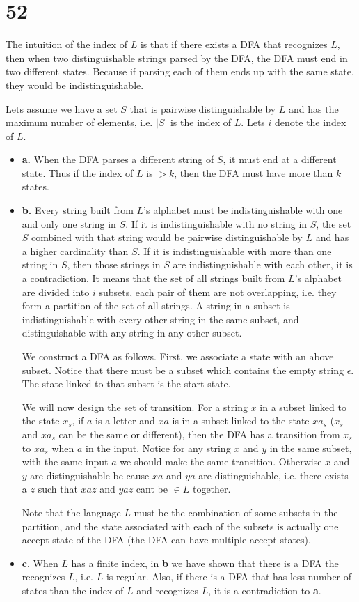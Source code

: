 \documentclass[12pt]{book}
\begin{document}
\section{52}
The intuition of the index of $L$ is that if there exists a DFA that recognizes $L$, then when two distinguishable strings parsed by the DFA, the DFA must end in two different states. Because if parsing each of them ends up with the same state, they would be indistinguishable.

Lets assume we have a set $S$ that is pairwise distinguishable by $L$ and has the maximum number of elements, i.e. $|S|$ is the index of $L$. Lets  $i$ denote the index of $L$.
\begin{itemize}
	\item \textbf{a.} When the DFA parses a different string of $S$, it must end at a different state. Thus if the index of $L$ is $> k$, then the DFA must have more than $k$ states.
	\item \textbf{b.} Every string built from $L$'s alphabet must be indistinguishable with one and only one string in $S$. If it is indistinguishable with no string in $S$, the set $S$ combined with that string would be pairwise distinguishable by $L$ and has a higher cardinality than $S$. If it is indistinguishable with more than one string in $S$, then those strings in $S$ are indistinguishable with each other, it is a contradiction. It means that the set of all strings built from $L$'s alphabet are divided into $i$ subsets, each pair of them are not overlapping, i.e. they form a partition of the set of all strings. A string in a subset is indistinguishable with every other string in the same subset, and distinguishable with any string in any other subset.
	
	We construct a DFA as follows. First, we associate a state with an above subset. Notice that there must be a subset which contains the empty string $\epsilon$. The state linked to that subset is the start state.
	
	We will now design the set of transition. For a string $x$ in a subset linked to the state $x_s$, if $a$ is a letter and $xa$ is in a subset linked to the state $xa_s$ ($x_s$ and $xa_s$ can be the same or different), then the DFA has a transition from $x_s$ to $xa_s$ when $a$ in the input. Notice for any string $x$ and $y$ in the same subset, with the same input $a$ we should make the same transition. Otherwise $x$ and $y$ are distinguishable be cause $xa$ and $ya$ are distinguishable, i.e. there exists a $z$ such that $xaz$ and $yaz$ cant be $\in L$ together.
	
	Note that the language $L$ must be the combination of some subsets in the partition, and the state associated with each of the subsets is actually one accept state of the DFA (the DFA can have multiple accept states).
	\item \textbf{c}. When $L$ has a finite index, in \textbf{b} we have shown that there is a DFA the recognizes $L$, i.e. $L$ is regular. Also, if there is a DFA that has less number of states than the index of $L$ and recognizes $L$, it is a contradiction to \textbf{a}.
	
\end{itemize}
\end{document}
